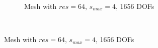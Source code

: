\begin{figure}[H]
    \begin{subfigure}[b]{1\linewidth}
        \centering
        \caption{Mesh with $res=64$, $s_{max}=4$, 1656 DOFs}
    \end{subfigure}
    \\
\end{figure}

